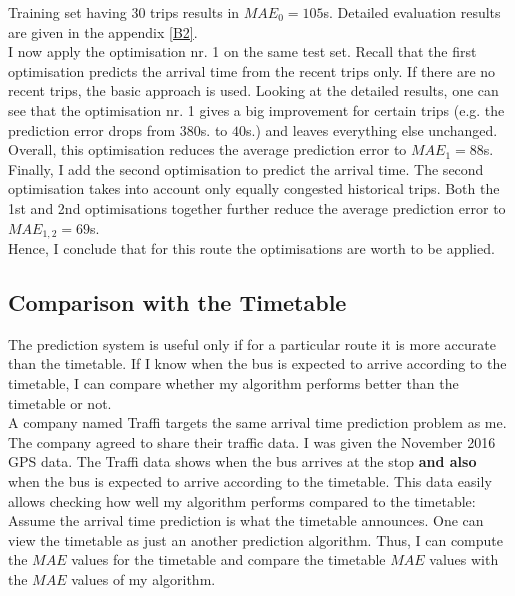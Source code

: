 \documentclass[12pt,a4paper,oneside,openright]{report}
\begin{document}
Training set having $30$ trips results in $MAE_0 = 105$s. Detailed
evaluation results are given in the appendix \textcolor{blue}{\ref{B2}}. \\

I now apply the optimisation nr. 1 on the same test set. Recall that
the first optimisation predicts the arrival time from the recent trips only.
If there are no recent trips, the basic approach is used. Looking at the
detailed results, one can see that the optimisation nr. 1 gives a big improvement
for certain trips (e.g. the prediction error drops from $380$s. to $40$s.) and leaves
everything else unchanged. Overall, this optimisation reduces the average prediction
error to $MAE_1 = 88$s. \\

Finally, I add the second optimisation to predict the arrival time. The
second optimisation takes into account only equally congested historical trips.
Both the 1st and 2nd optimisations together further reduce the average
prediction error to $MAE_{1,2} = 69$s. \\

Hence, I conclude that for this route the optimisations are worth to be applied.

\newpage

\subsection*{Comparison with the Timetable}

The prediction system is useful only if for a particular route it is more accurate than
the timetable. If I know when the bus is expected to arrive according to the timetable,
I can compare whether my algorithm performs better than the timetable or not. \\

A company named Traffi targets the same arrival time prediction
problem as me. The company agreed to share their traffic
data. I was given the November 2016 GPS data. The Traffi data shows when the bus arrives
at the stop \textbf{and also} when the bus is expected to arrive according to the timetable.
This data easily allows checking how well my algorithm performs compared to the timetable: \\

Assume the arrival time prediction is what the timetable announces. One can view the
timetable as just an another prediction algorithm. Thus, I can compute the $MAE$ values for the
timetable and compare the timetable $MAE$ values with the $MAE$ values of my algorithm. \\
\end{document}
